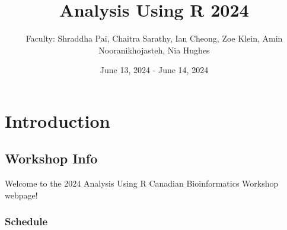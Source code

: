 \documentclass[
]{book}
\title{Analysis Using R 2024}
\author{Faculty: Shraddha Pai, Chaitra Sarathy, Ian Cheong, Zoe Klein, Amin Nooranikhojasteh, Nia Hughes}
\date{June 13, 2024 - June 14, 2024}
\begin{document}
\maketitle

{
\setcounter{tocdepth}{1}
\tableofcontents
}
\part{Introduction}\label{part-introduction}

\chapter{Workshop Info}\label{workshop-info}

Welcome to the 2024 Analysis Using R Canadian Bioinformatics Workshop webpage!

\section{Schedule}\label{schedule}
\end{document}
